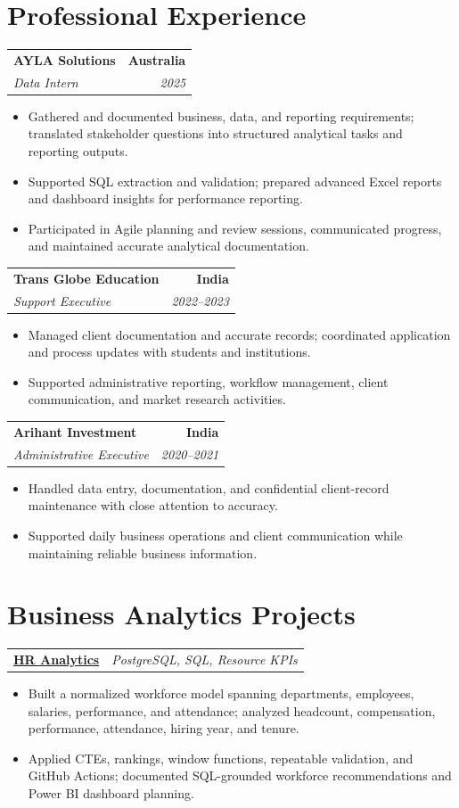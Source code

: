 \documentclass[letterpaper,10pt]{article}
\makeatletter
\newcommand{\role}[4]{%
  \begin{tabularx}{\textwidth}{@{}Xr@{}}
    \textbf{#1} & \textbf{#2} \\
    \textit{#3} & \textit{#4}
  \end{tabularx}\vspace{-1pt}
}
\newcommand{\project}[2]{%
  \begin{tabularx}{\textwidth}{@{}Xr@{}}
    \textbf{#1} & \textit{#2}
  \end{tabularx}\vspace{-1pt}
}
\makeatother
\begin{document}
\section{Professional Experience}
\role{AYLA Solutions}{Australia}{Data Intern}{2025}
\begin{itemize}
  \item Gathered and documented business, data, and reporting requirements; translated stakeholder questions into structured analytical tasks and reporting outputs.
  \item Supported SQL extraction and validation; prepared advanced Excel reports and dashboard insights for performance reporting.
  \item Participated in Agile planning and review sessions, communicated progress, and maintained accurate analytical documentation.
\end{itemize}
\vspace{1pt}

\role{Trans Globe Education}{India}{Support Executive}{2022--2023}
\begin{itemize}
  \item Managed client documentation and accurate records; coordinated application and process updates with students and institutions.
  \item Supported administrative reporting, workflow management, client communication, and market research activities.
\end{itemize}
\vspace{1pt}

\role{Arihant Investment}{India}{Administrative Executive}{2020--2021}
\begin{itemize}
  \item Handled data entry, documentation, and confidential client-record maintenance with close attention to accuracy.
  \item Supported daily business operations and client communication while maintaining reliable business information.
\end{itemize}

\section{Business Analytics Projects}
\project{\href{https://github.com/jainalimehta/HR-Analytics}{HR Analytics}}{PostgreSQL, SQL, Resource KPIs}
\begin{itemize}
  \item Built a normalized workforce model spanning departments, employees, salaries, performance, and attendance; analyzed headcount, compensation, performance, attendance, hiring year, and tenure.
  \item Applied CTEs, rankings, window functions, repeatable validation, and GitHub Actions; documented SQL-grounded workforce recommendations and Power BI dashboard planning.
\end{itemize}
\vspace{1pt}
\end{document}
